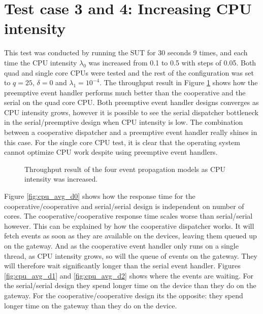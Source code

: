 \section{Test case 3 and 4: Increasing CPU intensity}

This test was conducted by running the SUT for 30 seconds 9 times, and each
time the CPU intensity $\lambda_0$ was increased from 0.1 to 0.5 with steps of
0.05. Both quad and single core CPUs were tested and the rest of the
configuration was set to $q = 25$, $\delta = 0$ and $\lambda_1 = 10^{-4}$. The
throughput result in Figure \ref{fig:cpu_throughput} shows how the preemptive
event handler performs much better than the cooperative and the serial on the
quad core CPU. Both preemptive event handler designs converges as CPU intensity
grows, however it is possible to see the serial dispatcher bottleneck in the
serial/preemptive design when CPU intensity is low. The combination between a
cooperative dispatcher and a preemptive event handler really shines in this
case. For the single core CPU test, it is clear that the operating system
cannot optimize CPU work despite using preemptive event handlers.

\begin{figure}[h!]
    \centering
    \caption{Throughput result of the four event propagation models as CPU
    intensity was increased.}
    \label{fig:cpu_throughput}
\end{figure}

Figure \ref{fig:cpu_avg_d0} shows how the response time for the
cooperative/cooperative and serial/serial design is independent on number of
cores. The cooperative/cooperative response time scales worse than
serial/serial however. This can be explained by how the cooperative dispatcher
works. It will fetch events as soon as they are available on the devices,
leaving them queued up on the gateway. And as the cooperative event handler
only runs on a single thread, as CPU intensity grows, so will the queue of
events on the gateway. They will therefore wait significantly longer than the
serial event handler. Figures \ref{fig:cpu_avg_d1} and \ref{fig:cpu_avg_d2}
shows where the events are waiting. For the serial/serial design they spend
longer time on the device than they do on the gateway. For the
cooperative/cooperative design its the opposite: they spend longer time on the
gateway than they do on the device.


